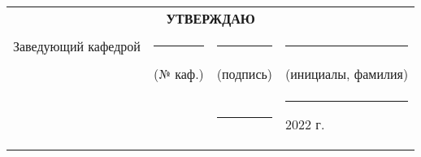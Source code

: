 \documentclass{article}
\begin{document}
\begin{center}
\vspace{14pt}

\hfill
\begin{minipage}{0.7\textwidth}
\raggedleft
\begin{tabular}{@{}llll}  
    \multicolumn{4}{c}{\textbf{УТВЕРЖДАЮ}}\\
    Заведующий кафедрой & \rule{1cm}{0.5pt} & \rule{2cm}{0.5pt} & \rule{3.5cm}{0.5pt}\\
                        & \scriptsize{(№ каф.)} & \scriptsize{(подпись)}& \scriptsize{(инициалы, фамилия)}\\
    \rule{0pt}{14pt} &   & \rule{2cm}{0.5pt}  & \rule{2.5cm}{0.5pt} 2022 г. \\ 
\end{tabular}
\end{minipage}
\vspace{14pt}


\end{center}
\end{document}
